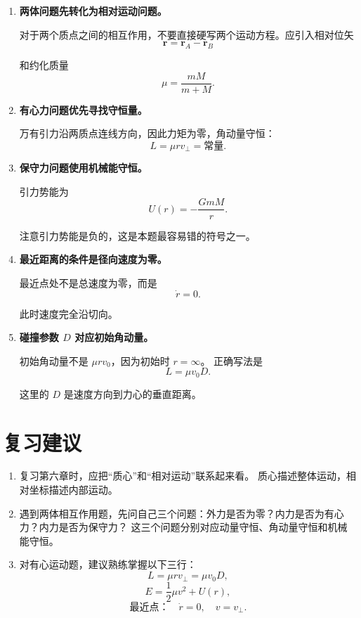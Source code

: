 \documentclass[11pt,a4paper]{ctexart}
\begin{document}
\begin{tipBox}
\begin{enumerate}
    \item \textbf{两体问题先转化为相对运动问题。}
    
    对于两个质点之间的相互作用，不要直接硬写两个运动方程。应引入相对位矢
    \[
    \bm r=\bm r_A-\bm r_B
    \]

    和约化质量
    \[
    \mu=\frac{mM}{m+M}.
    \]

    \item \textbf{有心力问题优先寻找守恒量。}
    
    万有引力沿两质点连线方向，因此力矩为零，角动量守恒：
    \[
    L=\mu r v_\perp=\text{常量}.
    \]

    \item \textbf{保守力问题使用机械能守恒。}
    
    引力势能为
    \[
    U(r)=-\frac{GmM}{r}.
    \]

    注意引力势能是负的，这是本题最容易错的符号之一。

    \item \textbf{最近距离的条件是径向速度为零。}
    
    最近点处不是总速度为零，而是
    \[
    \dot r=0.
    \]

    此时速度完全沿切向。

    \item \textbf{碰撞参数 $D$ 对应初始角动量。}
    
    初始角动量不是 $\mu r v_0$，因为初始时 $r=\infty$。
    正确写法是
    \[
    L=\mu v_0D.
    \]

    这里的 $D$ 是速度方向到力心的垂直距离。
\end{enumerate}
\end{tipBox}

\section*{复习建议}

\begin{enumerate}
    \item 复习第六章时，应把“质心”和“相对运动”联系起来看。
    质心描述整体运动，相对坐标描述内部运动。
    
    \item 遇到两体相互作用题，先问自己三个问题：外力是否为零？内力是否为有心力？内力是否为保守力？
    这三个问题分别对应动量守恒、角动量守恒和机械能守恒。

    \item 对有心运动题，建议熟练掌握以下三行：
    \[
    L=\mu r v_\perp=\mu v_0D,
    \]
    \[
    E=\frac{1}{2}\mu v^2+U(r),
    \]
    \[
    \text{最近点：}\quad \dot r=0,\quad v=v_\perp.
    \]
\end{enumerate}
\end{document}
